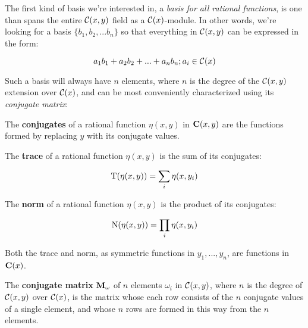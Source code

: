 %
%
%
%
%
%
%
%
%


The first kind of basis we're interested in, a {\it basis for all
rational functions}, is one than spans the entire ${\cal C}(x,y)$ field
as a ${\cal C}(x)$-module.
In other words, we're looking for a basis $\{b_1, b_2,
... b_n\}$ so that everything in ${\cal C}(x,y)$ can be expressed
in the form:

	$$ a_1 b_1 + a_2 b_2 + ... + a_n b_n; a_i \in {\cal C}(x) $$

Such a basis will always have $n$ elements, where $n$ is the degree of
the ${\cal C}(x,y)$ extension over ${\cal C}(x)$, and can be most
conveniently characterized using its {\it conjugate matrix}:


The {\bf conjugates} of a rational function $\eta(x,y)$ in ${\bf
C}(x,y)$ are the functions formed by replacing $y$ with its conjugate
values.

The {\bf trace} of a rational function $\eta(x,y)$ is the sum of
its conjugates:

$${\rm T}(\eta(x,y)) = \sum_i \eta(x,y_i)$$

The {\bf norm} of a rational function $\eta(x,y)$ is the product of
its conjugates:

$${\rm N}(\eta(x,y)) = \prod_i \eta(x,y_i)$$

Both the trace and norm, as symmetric functions in $y_1,...,y_n$, are
functions in ${\bf C}(x)$.

The {\bf conjugate matrix} ${\bf M}_\omega$ of $n$ elements $\omega_i$
in ${\cal C}(x,y)$, where $n$ is the degree of ${\cal C}(x,y)$ over
${\cal C}(x)$, is the matrix whose each row consists of the $n$
conjugate values of a single element, and whose $n$ rows are formed in
this way from the $n$ elements.

